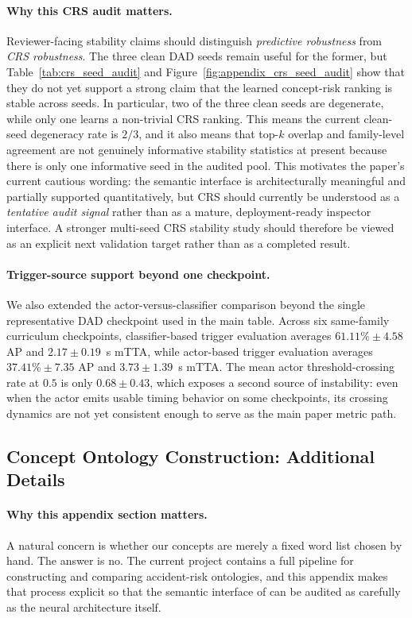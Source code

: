 \paragraph{Why this CRS audit matters.}
Reviewer-facing stability claims should distinguish \emph{predictive robustness}
from \emph{CRS robustness}. The three clean DAD seeds remain useful for the
former, but Table~\ref{tab:crs_seed_audit} and
Figure~\ref{fig:appendix_crs_seed_audit} show that they do not yet support a
strong claim that the learned concept-risk ranking is stable across seeds.
In particular, two of the three clean seeds are degenerate, while only one
learns a non-trivial CRS ranking. This means the current clean-seed degeneracy
rate is $2/3$, and it also means that top-$k$ overlap and family-level
agreement are not genuinely informative stability statistics at present because
there is only one informative seed in the audited pool. This motivates the
paper's current cautious wording: the semantic interface is architecturally
meaningful and partially supported quantitatively, but CRS should currently be
understood as a \emph{tentative audit signal} rather than as a mature,
deployment-ready inspector interface. A stronger multi-seed CRS stability study
should therefore be viewed as an explicit next validation target rather than as
a completed result.

\paragraph{Trigger-source support beyond one checkpoint.}
We also extended the actor-versus-classifier comparison beyond the single
representative DAD checkpoint used in the main table. Across six same-family
curriculum checkpoints, classifier-based trigger evaluation averages
$61.11\%\pm4.58$ AP and $2.17\pm0.19$~s mTTA, while actor-based trigger
evaluation averages $37.41\%\pm7.35$ AP and $3.73\pm1.39$~s mTTA. The mean
actor threshold-crossing rate at $0.5$ is only $0.68\pm0.43$, which exposes a
second source of instability: even when the actor emits usable timing behavior
on some checkpoints, its crossing dynamics are not yet consistent enough to
serve as the main paper metric path.

\subsection{Concept Ontology Construction: Additional Details}
\label{app:concept_pipeline}

\paragraph{Why this appendix section matters.}
A natural concern is whether our concepts are merely a fixed word list
chosen by hand. The answer is no. The current project contains a full pipeline
for constructing and comparing accident-risk ontologies, and this appendix
makes that process explicit so that the semantic interface of \method{} can be
audited as carefully as the neural architecture itself.

